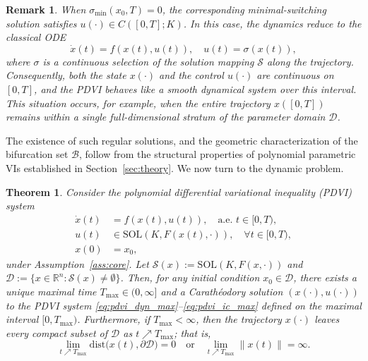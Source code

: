 \documentclass[sn-basic,Numbered]{sn-jnl}
\newcommand{\SOL}{\mathrm{SOL}}
\theoremstyle{thmstyleone}%
\newtheorem{theorem}{Theorem}%
\newtheorem{remark}{Remark}%
\begin{document}
\begin{remark}
When $\sigma_{\min}(x_0, T) = 0$, the corresponding minimal-switching solution satisfies $u(\cdot) \in C([0, T]; K)$. In this case, the dynamics reduce to the classical ODE
\[
 \dot{x}(t) = f(x(t), u(t)), \quad u(t) = \sigma(x(t)),
\]
where $\sigma$ is a continuous selection of the solution mapping $\mathcal{S}$ along the trajectory\cite{Han2024}. Consequently, both the state $x(\cdot)$ and the control $u(\cdot)$ are continuous on $[0, T]$, and the PDVI behaves like a smooth dynamical system over this interval. This situation occurs, for example, when the entire trajectory $x([0, T])$ remains within a single full-dimensional stratum of the parameter domain $\mathcal{D}$.
\end{remark}

The existence of such regular solutions, and the geometric characterization of the bifurcation set $\mathcal{B}$, follow from the structural properties of polynomial parametric VIs established in Section~\ref{sec:theory}. We now turn to the dynamic problem.

\begin{theorem} \label{thm:maximal_existence}
Consider the polynomial differential variational inequality (PDVI) system
\begin{subequations}
\begin{align}
\dot{x}(t) &= f(x(t), u(t)), \quad \text{a.e. } t \in [0, T), \label{eq:pdvi_dyn_max} \\
u(t) &\in \SOL(K, F(x(t), \cdot)), \quad \forall t \in [0, T), \label{eq:pdvi_vi_max} \\
x(0) &= x_0, \label{eq:pdvi_ic_max}
\end{align}
\end{subequations}
under Assumption~\ref{ass:core}. Let $\mathcal{S}(x) := \SOL(K, F(x, \cdot))$ and $\mathcal{D} := \{x \in \mathbb{R}^n : \mathcal{S}(x) \neq \emptyset\}$. Then, for any initial condition $x_0 \in \mathcal{D}$, there exists a unique maximal time $T_{\max} \in (0, \infty]$ and a Carath\'{e}odory solution $(x(\cdot), u(\cdot))$ to the PDVI system \eqref{eq:pdvi_dyn_max}--\eqref{eq:pdvi_ic_max} defined on the maximal interval $[0, T_{\max})$. Furthermore, if $T_{\max} < \infty$, then the trajectory $x(\cdot)$ leaves every compact subset of $\mathcal{D}$ as $t \nearrow T_{\max}$; that is,
\[ 
\lim_{t \nearrow T_{\max}} \mathrm{dist}\big(x(t), \partial \mathcal{D}\big) = 0 
\quad \text{or} \quad 
\lim_{t \nearrow T_{\max}} \|x(t)\| = \infty.
\]
\end{theorem}
\end{document}
